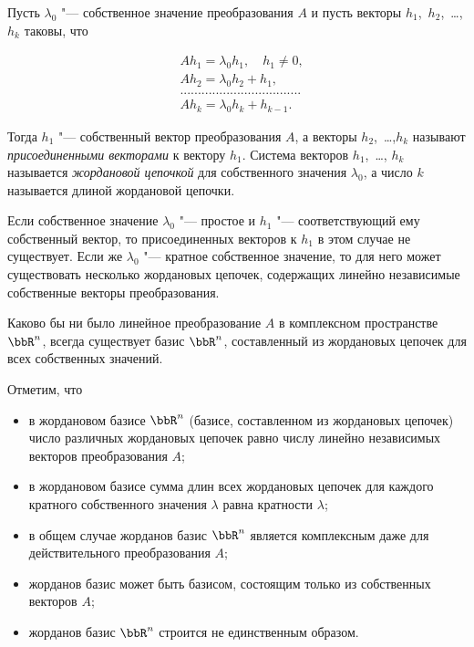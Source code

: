 \begin{defn}
Пусть $\lambda_0$ "--- собственное значение преобразования $A$ и пусть векторы $h_1$,~$h_2$,~\dots, $h_k$ таковы, что 

\begin{equation} \label{27eq2.3}
\begin{aligned}
&Ah_1=\lambda_0h_1,\quad h_1\neq 0,\\
&Ah_2=\lambda_0h_2+h_1,\\
&..................................\\
&Ah_k=\lambda_0h_k+h_{k-1}.
\end{aligned}
\end{equation}

Тогда $h_1$ "--- собственный вектор преобразования $A$, а векторы $h_2$,~\dots,$h_k$ называют \textit{присоединенными векторами} к вектору $h_1$. Система векторов $h_1$,~\dots, $h_k$ называется \textit{жордановой цепочкой} для собственного значения $\lambda_0$, а число $k$ называется длиной жордановой цепочки.

Если собственное значение $\lambda_0$ "--- простое и $h_1$ "--- соответствующий ему собственный вектор, то присоединенных векторов к $h_1$ в этом случае не существует. Если же $\lambda_0$ "--- кратное собственное значение, то для него может существовать несколько жордановых цепочек, содержащих линейно независимые собственные векторы преобразования.   

\end{defn}

\begin{thm}[Жордана]\label{27thmJ}
Каково бы ни было линейное преобразование $A$ в комплексном пространстве $\bbR^n$, всегда существует базис $\bbR^n$, составленный из жордановых цепочек для всех собственных значений.
\end{thm}

Отметим, что 
\begin{itemize} 
\item в жордановом базисе $\bbR^n$ (базисе, составленном из жордановых цепочек) число различных жордановых цепочек равно числу линейно независимых векторов преобразования $A$;
\item в жордановом базисе сумма длин всех жордановых цепочек для каждого кратного собственного значения $\lambda$ равна кратности $\lambda$;
\item в общем случае жорданов базис $\bbR^n$ является комплексным даже для действительного преобразования $A$;
\item жорданов базис может быть базисом, состоящим только из собственных векторов $A$;
\item жорданов базис $\bbR^n$ строится не единственным образом.
\end{itemize}

